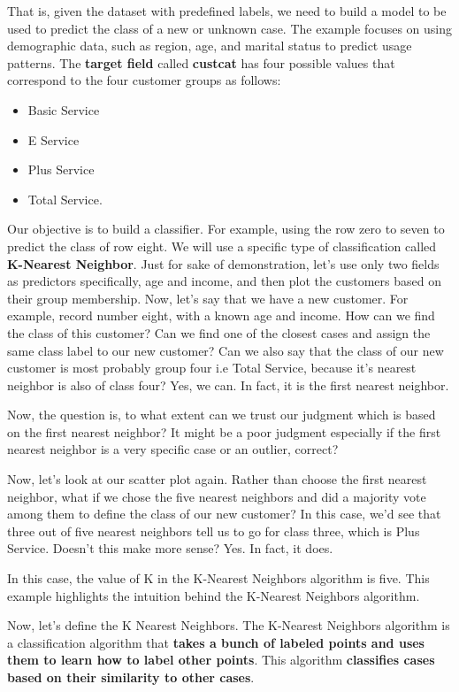 	That is, given the dataset with predefined labels, we need to build a model to be used to predict the class of a new or unknown case. The example focuses on using demographic data, such as region, age, and marital status to predict usage patterns. The \textbf{target field} called \textbf{custcat} has four possible values that correspond to the four customer groups as follows: 
	
	\begin{itemize}
		\item Basic Service
		\item E Service
		\item Plus Service 
		\item Total Service. 
	\end{itemize}
		
	Our objective is to build a classifier. For example, using the row zero to seven to predict the class of row eight. We will use a specific type of classification called \textbf{K-Nearest Neighbor}. Just for sake of demonstration, let's use only two fields as predictors specifically, age and income, and then plot the customers based on their group membership. Now, let's say that we have a new customer. For example, record number eight, with a known age and income. How can we find the class of this customer? Can we find one of the closest cases and assign the same class label to our new customer? Can we also say that the class of our new customer is most probably group four i.e Total Service, because it's nearest neighbor is also of class four? Yes, we can. In fact, it is the first nearest neighbor. 
	
	Now, the question is, to what extent can we trust our judgment which is based on the first nearest neighbor? It might be a poor judgment especially if the first nearest neighbor is a very specific case or an outlier, correct? 
	
	Now, let's look at our scatter plot again. Rather than choose the first nearest neighbor, what if we chose the five nearest neighbors and did a majority vote among them to define the class of our new customer? In this case, we'd see that three out of five nearest neighbors tell us to go for class three, which is Plus Service. Doesn't this make more sense? Yes. In fact, it does. 
	
	In this case, the value of K in the K-Nearest Neighbors algorithm is five. This example highlights the intuition behind the K-Nearest Neighbors algorithm. 
	
	Now, let's define the K Nearest Neighbors. The K-Nearest Neighbors algorithm is a classification algorithm that \textbf{takes a bunch of labeled points and uses them to learn how to label other points}. This algorithm \textbf{classifies cases based on their similarity to other cases}. 
	
